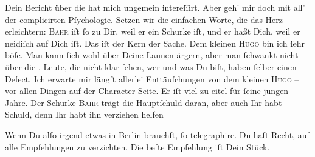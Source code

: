 \pstart
           Dein Bericht über die \label{K_L02766-10v}\label{K_L02766-10} hat mich ungemein intereſſirt. Aber geh’ mir doch mit all’ der complicirten
               Pſychologie. Setzen wir die einfachen Worte, die das Herz erleichtern: \textsc{Bahr} iſt ſo zu Dir,  weil er ein Schurke iſt,
               und er haßt Dich, weil er neidiſch auf Dich iſt. Das iſt der Kern der Sache. Dem
               kleinen {\pb}\textsc{Hugo} bin ich ſehr böſe. Man kann ſich wohl über Deine  Launen ärgern, aber man ſchwankt nicht über die \label{K_L02766-11v}\label{K_L02766-11}. Leute, die nicht klar ſehen, wer und was Du biſt, haben ſelber einen Defect.
               Ich erwarte mir längſt allerlei Enttäuſchungen 
               von dem kleinen \textsc{Hugo} – vor allen  Dingen auf der Character-Seite.
               Er iſt viel zu eitel für ſeine jungen Jahre. Der Schurke \textsc{Bahr} trägt {\pb}die Hauptſchuld daran, aber auch Ihr
               habt Schuld, denn Ihr habt ihn verziehen helfen{\dotsfive}\pend
           
\pstart
           Wenn Du alſo irgend etwas in Berlin brauchſt, ſo
               telegraphire. Du haſt Recht, auf alle Empfehlungen zu verzichten. Die beſte
               Empfehlung iſt Dein Stück.\pend
           
